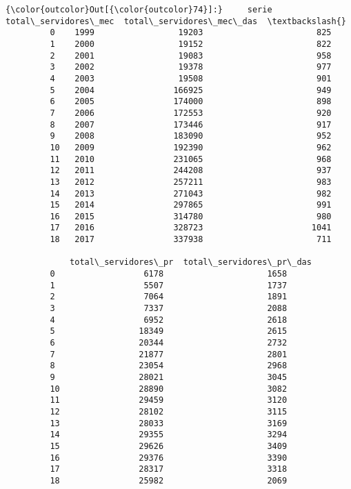 \documentclass[11pt]{article}
\begin{document}
\begin{Verbatim}[commandchars=\\\{\}]
{\color{outcolor}Out[{\color{outcolor}74}]:}     serie  total\_servidores\_mec  total\_servidores\_mec\_das  \textbackslash{}
         0    1999                 19203                       825   
         1    2000                 19152                       822   
         2    2001                 19083                       958   
         3    2002                 19378                       977   
         4    2003                 19508                       901   
         5    2004                166925                       949   
         6    2005                174000                       898   
         7    2006                172553                       920   
         8    2007                173446                       917   
         9    2008                183090                       952   
         10   2009                192390                       962   
         11   2010                231065                       968   
         12   2011                244208                       937   
         13   2012                257211                       983   
         14   2013                271043                       982   
         15   2014                297865                       991   
         16   2015                314780                       980   
         17   2016                328723                      1041   
         18   2017                337938                       711   
         
             total\_servidores\_pr  total\_servidores\_pr\_das  
         0                  6178                     1658  
         1                  5507                     1737  
         2                  7064                     1891  
         3                  7337                     2088  
         4                  6952                     2618  
         5                 18349                     2615  
         6                 20344                     2732  
         7                 21877                     2801  
         8                 23054                     2968  
         9                 28021                     3045  
         10                28890                     3082  
         11                29459                     3120  
         12                28102                     3115  
         13                28033                     3169  
         14                29355                     3294  
         15                29626                     3409  
         16                29376                     3390  
         17                28317                     3318  
         18                25982                     2069  
\end{Verbatim}
            
\end{document}
